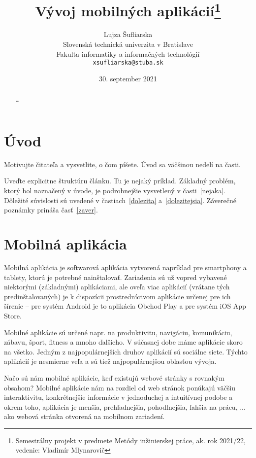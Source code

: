 \documentclass[10pt,twoside,slovak,a4paper]{article}
\title{Vývoj mobilných aplikácií\thanks{Semestrálny projekt v predmete Metódy inžinierskej práce, ak. rok 2021/22, vedenie: Vladimír Mlynarovič}} %
\author{Lujza Šufliarska\\[2pt]
	{\small Slovenská technická univerzita v Bratislave}\\
	{\small Fakulta informatiky a informačných technológií}\\
	{\small \texttt{xsufliarska@stuba.sk}}
	}
\date{\small 30. september 2021} %
\begin{document}
\maketitle

\begin{abstract}

\ldots
\end{abstract}



\section{Úvod}

Motivujte čitateľa a vysvetlite, o čom píšete. Úvod sa väčšinou nedelí na časti.

Uveďte explicitne štruktúru článku. Tu je nejaký príklad.
Základný problém, ktorý bol naznačený v úvode, je podrobnejšie vysvetlený v časti~\ref{nejaka}.
Dôležité súvislosti sú uvedené v častiach~\ref{dolezita} a~\ref{dolezitejsia}.
Záverečné poznámky prináša časť~\ref{zaver}.


\section{Mobilná aplikácia}
\quad Mobilná aplikácia je softwarová aplikácia vytvorená napríklad pre smartphony a tablety, ktorú je potrebné nainštalovať. Zariadenia sú už vopred vybavené niektorými (základnými) aplikáciami, ale oveľa viac aplikácií (vrátane tých predinštalovaných) je k dispozícii prostredníctvom aplikácie určenej pre ich šírenie – pre systém Android je to aplikácia Obchod Play a pre systém iOS App Store.

Mobilné aplikácie sú určené napr. na produktivitu, navigáciu, komunikáciu, zábavu, šport, fitness a mnoho ďalšieho. V súčasnej dobe máme aplikácie skoro na všetko. Jedným z najpopulárnejších druhov aplikácií sú sociálne siete. Týchto aplikácií je nesmierne veľa a sú tiež najpopulárnejšou oblasťou vývoja.

Načo sú nám mobilné aplikácie, keď existujú webové stránky s rovnakým obsahom? Mobilné aplikácie nám na rozdiel od web stránok ponúkajú väčšiu interaktivitu, konkrétnejšie informácie v jednoduchej a intuitívnej podobe a okrem toho, aplikácia je menšia, prehľadnejšia, pohodlnejšia, ľahšia na prácu, ... ako webová stránka otvorená na mobilnom zariadení.
\end{document}
